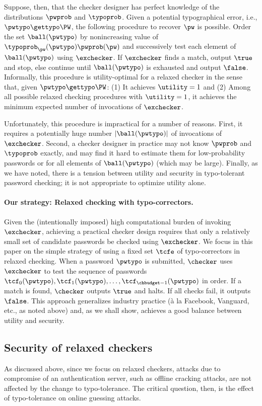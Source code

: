 Suppose, then, that the checker designer has perfect knowledge of the distributions $\pwprob$ and $\typoprob$. 
Given a potential typographical error, i.e., $\pwtypo \gettypo \PW$, the following procedure to recover $\pw$ is possible. Order the set $\ball(\pwtypo)$ by nonincreasing value of $\typoprob_{\pw}(\pwtypo)\pwprob(\pw)$ and successively test each element of $\ball(\pwtypo)$ using $\exchecker$. If
$\exchecker$ finds a match, output $\true$ and stop, else continue
until $\ball(\pwtypo)$ is exhausted and output $\false$. Informally, this procedure is utility-optimal for a relaxed checker in the sense that, given $\pwtypo \gettypo \PW$: (1) It achieves $\utility = 1$ and (2) Among all possible relaxed checking procedures with $\utility = 1$, it achieves the minimum expected number of invocations of $\exchecker$.

Unfortunately, this procedure is impractical for a number of reasons. First, it requires a potentially huge number $|\ball(\pwtypo)|$ of 
invocations of $\exchecker$. Second, a checker designer in practice may not know $\pwprob$ and $\typoprob$ exactly, and may find it hard to estimate them for low-probability passwords or for all elements of $\ball(\pwtypo)$ (which may be large). Finally, as we have noted, there is a tension between utility and security in typo-tolerant password checking; it is not appropriate to optimize utility alone.

\paragraph{Our strategy: Relaxed checking with typo-correctors.} Given the (intentionally imposed) high computational burden of invoking $\exchecker$, achieving a practical checker design requires that only a relatively small set of candidate passwords be checked using $\exchecker$. We focus in this paper on the simple strategy of using a fixed set $\tcfe$ of typo-correctors in relaxed checking. When a password $\pwtypo$ is submitted, $\checker$ uses $\exchecker$ to test the sequence of passwords $\tcf_0(\pwtypo), \tcf_1(\pwtypo), \ldots, \tcf_{\chbudget-1}(\pwtypo)$ in order. If a match is found, $\checker$ outputs $\true$ and halts. If all checks fail, it outputs $\false$. This approach generalizes industry practice (\`{a} la Facebook, Vanguard, etc., as noted above) and, as we shall show, achieves a good balance between utility and security. 

\subsection{Security of relaxed checkers}
\label{subsec:security}
As discussed above, since we focus on relaxed checkers, attacks due to
compromise of an authentication server, such as offline cracking
attacks, are not affected by the change to typo-tolerance. The
critical question, then, is the effect of typo-tolerance on online
guessing attacks. 

